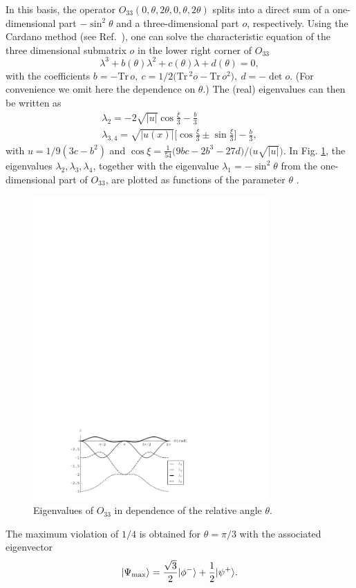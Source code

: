 \documentclass[prl,showpacs,showkeys,amsfonts,amsmath,twocolumn]{revtex4}
\newcommand{\ket}[1]{|#1\rangle}
\newcommand{\Tr}{\text{Tr}\,}
\begin{document}
In this basis, the operator $O_{33}(0,\theta,2\theta,0,\theta,2\theta)$
splits into a direct sum of a one-dimensional part $-\sin^2\theta $
and a three-dimensional part $o$, respectively. Using the Cardano method
(see Ref.~\cite{cocolicchio00}), one can
solve the characteristic equation of the three dimensional submatrix
$o$ in the lower right corner of $O_{33}$
\begin{equation}
  \lambda^3 + b(\theta) \lambda^2 + c(\theta) \lambda + d(\theta) = 0,
\label{2004-qbounds-characteristic}
\end{equation}
with the coefficients $b = -\Tr o,\ c = 1/2\Big(\Tr^2 o -
\Tr o^2 \Big),\ d = -\det o$. (For convenience we omit here the
dependence on $\theta$.) The (real) eigenvalues can then be written as \cite{cocolicchio00}
\begin{eqnarray}
\lambda_2 = -2 \sqrt{|u|}\cos\frac{\xi}{3}-\frac{b}{3}\nonumber\\
\lambda_{3,4} = \sqrt{|u(x)|}\Big[\cos\frac{\xi}{3} \pm
\sin\frac{\xi}{3}\Big]-\frac{b}{3},
\label{2004-qbounds-o33ev}
\end{eqnarray}
with $u=1/9(3 c-b^2)$ and $\cos\xi = \frac{1}{54}\big(9 b c -2 b^3 - 27 d\big)/\big(u\sqrt{|u|}\big)$.
In Fig. \ref{fig:2004-qbounds-f1},
the eigenvalues $\lambda_2, \lambda_3, \lambda_4$,
together with the eigenvalue $\lambda_1 = -\sin^2\theta$ from the
one-dimensional part of $O_{33}$, are plotted  as functions of the parameter $\theta$ .
\begin{figure}[htbp]
  \centering
  \includegraphics[width=90mm]{2004-qbounds-f1}
  \caption{Eigenvalues of $O_{33}$ in dependence of the relative angle $\theta$.}
  \label{fig:2004-qbounds-f1}
\end{figure}
The maximum violation of $1/4$ is obtained for $\theta=\pi/3$ with the associated
eigenvector
\begin{equation}
  \ket{\Psi_{\rm max}}=\frac{\sqrt{3}}{2}\ket{\phi^-}+\frac{1}{2}\ket{\psi^+}.
\label{2004-qbounds-pmax33}
\end{equation}
\end{document}
